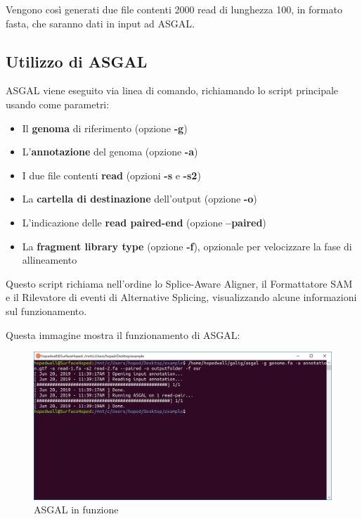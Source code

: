 Vengono così generati due file contenti 2000 read di lunghezza 100, in formato fasta, che saranno dati in input ad ASGAL.

\newpage

\subsection{Utilizzo di ASGAL}

ASGAL viene eseguito via linea di comando, richiamando lo script principale usando come parametri:

\begin{itemize}
	\item Il \textbf{genoma} di riferimento (opzione \textbf{-g})
	\item L'\textbf{annotazione} del genoma (opzione \textbf{-a})
	\item I due file contenti \textbf{read} (opzioni \textbf{-s} e \textbf{-s2})
	\item La \textbf{cartella di destinazione} dell'output (opzione \textbf{-o})
	\item L'indicazione delle \textbf{read paired-end} (opzione \textbf{--paired})
	\item La \textbf{fragment library type} (opzione \textbf{-f}), opzionale per velocizzare la fase di allineamento
\end{itemize}

Questo script richiama nell'ordine lo Splice-Aware Aligner, il Formattatore SAM e il Rilevatore di eventi di Alternative Splicing, visualizzando alcune informazioni sul funzionamento.

Questa immagine mostra il funzionamento di ASGAL:

\begin{figure}[h]
	\centering
	\includegraphics[width=\linewidth]{images/prompt.png}
  \caption{ASGAL in funzione}
  \label{fig:ASGALPrompt}
\end{figure}

